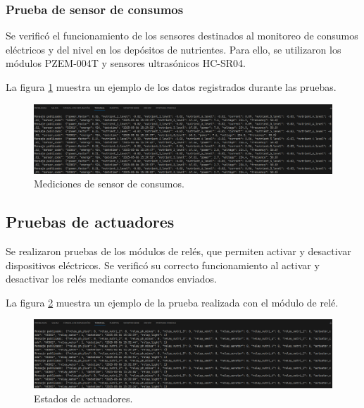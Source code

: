 \subsubsection{Prueba de sensor de consumos}

Se verificó el funcionamiento de los sensores destinados al monitoreo de
consumos eléctricos y del nivel en los depósitos de nutrientes. Para ello, se
utilizaron los módulos PZEM-004T y sensores ultrasónicos HC-SR04.

La figura \ref{fig:medicion_sensor_consumo} muestra un ejemplo de los datos
registrados durante las pruebas.

\begin{figure}[H]
    \centering
    \includegraphics[width=\textwidth]{Images/53_sensor_consumos.png}
    \caption[Mediciones de sensor de consumos]{Mediciones de sensor de consumos.}
    \label{fig:medicion_sensor_consumo}
\end{figure}

\subsection{Pruebas de actuadores}

Se realizaron pruebas de los módulos de relés, que permiten activar y
desactivar dispositivos eléctricos. Se verificó su correcto funcionamiento al
activar y desactivar los relés mediante comandos enviados.

La figura \ref{fig:prueba_rele_1} muestra un ejemplo de la prueba realizada con
el módulo de relé.

\begin{figure}[H]
    \centering
    \includegraphics[width=\textwidth]{Images/54_actuadores.png}
    \caption[Estados de actuadores]{Estados de actuadores.}
    \label{fig:prueba_rele_1}
\end{figure}

